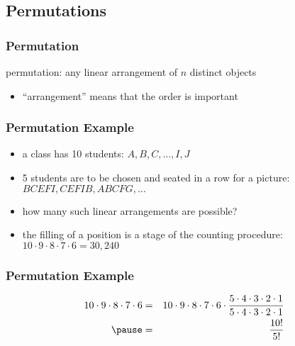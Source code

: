 \documentclass[dvipsnames]{beamer}
\begin{document}
\subsection{Permutations}

\begin{frame}
  \frametitle{Permutation}

  \begin{definition}
    \alert{permutation}: any linear arrangement of $n$ distinct objects
  \end{definition}

  \begin{itemize}
    \item ``arrangement'' means that the order is important
  \end{itemize}
\end{frame}

\begin{frame}
  \frametitle{Permutation Example}

  \begin{example}
    \begin{itemize}
      \item a class has 10 students: $A, B, C, \ldots, I, J$
      \item 5 students are to be chosen and seated in a row for a picture:\\
        \smallskip
        $BCEFI, CEFIB, ABCFG, \ldots$
      \item how many such linear arrangements are possible?

      \pause
      \medskip
      \item the filling of a position is a stage of the counting procedure:\\
        $10 \cdot 9 \cdot 8 \cdot 7 \cdot 6 = 30,240$
    \end{itemize}
  \end{example}
\end{frame}

\begin{frame}
  \frametitle{Permutation Example}

  \begin{example}
    \begin{eqnarray*}
      10 \cdot 9 \cdot 8 \cdot 7 \cdot 6 & = &
        10 \cdot 9 \cdot 8 \cdot 7 \cdot 6 \cdot
        \frac{5 \cdot 4 \cdot 3 \cdot 2 \cdot 1}
        {5 \cdot 4 \cdot 3 \cdot 2 \cdot 1}\\\pause
      & = & \frac{10!}{5!}
    \end{eqnarray*}
  \end{example}
\end{frame}
\end{document}
